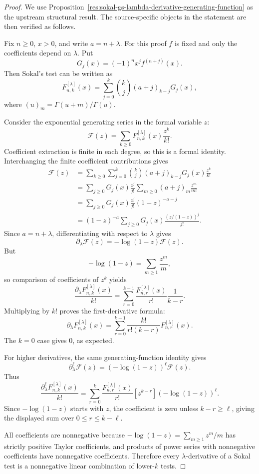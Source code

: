 \documentclass[11pt]{article}
\numberwithin{equation}{section}
\theoremstyle{definition}
\theoremstyle{remark}
\newcommand{\1}{\mathbf 1}
\begin{document}
\begin{proof}
We use Proposition~\ref{res:sokal-gs-lambda-derivative-generating-function} as the upstream structural result. The source-specific objects in the statement are then verified as follows.

Fix \(n\ge0\), \(x>0\), and write \(a=n+\lambda\). For this proof \(f\) is fixed and only the coefficients depend on \(\lambda\). Put
\[
G_j(x)=(-1)^n x^j f^{(n+j)}(x).
\]
Then Sokal's test can be written as
\[
F^{[\lambda]}_{n,k}(x)
=
\sum_{j=0}^k \binom{k}{j}(a+j)_{k-j}G_j(x),
\]
where \((u)_m=\Gamma(u+m)/\Gamma(u)\).

Consider the exponential generating series in the formal variable \(z\):
\[
\mathcal F(z)
=
\sum_{k\ge0}F^{[\lambda]}_{n,k}(x)\frac{z^k}{k!}.
\]
Coefficient extraction is finite in each degree, so this is a formal identity. Interchanging the finite coefficient contributions gives
\[
\begin{aligned}
\mathcal F(z)
&=\sum_{k\ge0}\sum_{j=0}^k
\binom{k}{j}(a+j)_{k-j}G_j(x)\frac{z^k}{k!}\\
&=\sum_{j\ge0}G_j(x)\frac{z^j}{j!}
\sum_{m\ge0}(a+j)_m\frac{z^m}{m!}\\
&=\sum_{j\ge0}G_j(x)\frac{z^j}{j!}(1-z)^{-a-j}\\
&=(1-z)^{-a}\sum_{j\ge0}G_j(x)
\frac{(z/(1-z))^j}{j!}.
\end{aligned}
\]
Since \(a=n+\lambda\), differentiating with respect to \(\lambda\) gives
\[
\partial_\lambda \mathcal F(z)
=
-\log(1-z)\mathcal F(z).
\]
But
\[
-\log(1-z)=\sum_{m\ge1}\frac{z^m}{m},
\]
so comparison of coefficients of \(z^k\) yields
\[
\frac{\partial_\lambda F^{[\lambda]}_{n,k}(x)}{k!}
=
\sum_{r=0}^{k-1}
\frac{F^{[\lambda]}_{n,r}(x)}{r!}\frac1{k-r}.
\]
Multiplying by \(k!\) proves the first-derivative formula:
\[
\partial_\lambda F^{[\lambda]}_{n,k}(x)
=
\sum_{r=0}^{k-1}\frac{k!}{r!(k-r)}
F^{[\lambda]}_{n,r}(x).
\]
The \(k=0\) case gives \(0\), as expected.

For higher derivatives, the same generating-function identity gives
\[
\partial_\lambda^\ell \mathcal F(z)
=
(-\log(1-z))^\ell \mathcal F(z).
\]
Thus
\[
\frac{\partial_\lambda^\ell F^{[\lambda]}_{n,k}(x)}{k!}
=
\sum_{r=0}^{k}
\frac{F^{[\lambda]}_{n,r}(x)}{r!}
[z^{k-r}](-\log(1-z))^\ell.
\]
Since \(-\log(1-z)\) starts with \(z\), the coefficient is zero unless \(k-r\ge\ell\), giving the displayed sum over \(0\le r\le k-\ell\).

All coefficients are nonnegative because \(-\log(1-z)=\sum_{m\ge1}z^m/m\) has strictly positive Taylor coefficients, and products of power series with nonnegative coefficients have nonnegative coefficients. Therefore every \(\lambda\)-derivative of a Sokal test is a nonnegative linear combination of lower-\(k\) tests.


\end{proof}
\end{document}
